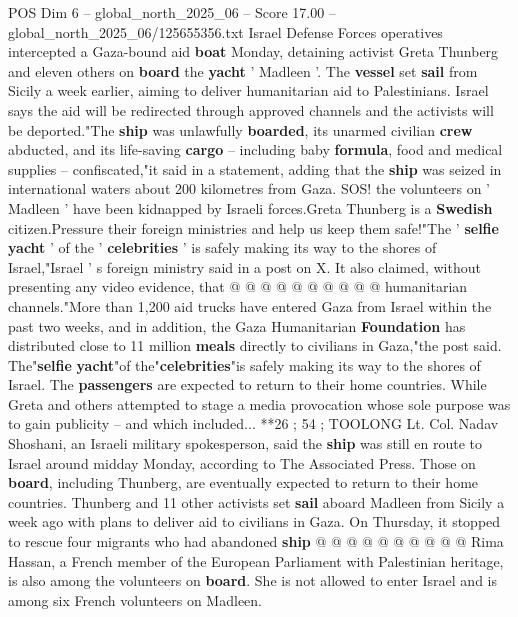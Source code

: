 \begin{textsample}{POS Dim 6 – global\_north\_2025\_06 – Score 17.00 – global\_north\_2025\_06/125655356.txt}  \label{ex:f6_pos_028}
Israel Defense Forces operatives intercepted a Gaza-bound aid \textbf{boat} Monday, detaining activist Greta Thunberg and eleven others on \textbf{board} the \textbf{yacht} ' Madleen '.
The \textbf{vessel} set \textbf{sail} from Sicily a week earlier, aiming to deliver humanitarian aid to Palestinians.
Israel says the aid will be redirected through approved channels and the activists will be deported."The \textbf{ship} was unlawfully \textbf{boarded}, its unarmed civilian \textbf{crew} abducted, and its life-saving \textbf{cargo} -- including baby \textbf{formula}, food and medical supplies -- confiscated,"it said in a statement, adding that the \textbf{ship} was seized in international waters about 200 kilometres from Gaza.
SOS! the volunteers on ' Madleen ' have been kidnapped by Israeli forces.Greta Thunberg is a \textbf{Swedish} citizen.Pressure their foreign ministries and help us keep them safe!"The ' \textbf{selfie} \textbf{yacht} ' of the ' \textbf{celebrities} ' is safely making its way to the shores of Israel,"Israel ' s foreign ministry said in a post on X.
It also claimed, without presenting any video evidence, that @ @ @ @ @ @ @ @ @ @ humanitarian channels."More than 1,200 aid trucks have entered Gaza from Israel within the past two weeks, and in addition, the Gaza Humanitarian \textbf{Foundation} has distributed close to 11 million \textbf{meals} directly to civilians in Gaza,"the post said.
The"\textbf{selfie} \textbf{yacht}"of the"\textbf{celebrities}"is safely making its way to the shores of Israel.
The \textbf{passengers} are expected to return to their home countries.
While Greta and others attempted to stage a media provocation whose sole purpose was to gain publicity -- and which included... **26 ; 54 ; TOOLONG Lt.
Col.
Nadav Shoshani, an Israeli military spokesperson, said the \textbf{ship} was still en route to Israel around midday Monday, according to The Associated Press.
Those on \textbf{board}, including Thunberg, are eventually expected to return to their home countries.
Thunberg and 11 other activists set \textbf{sail} aboard Madleen from Sicily a week ago with plans to deliver aid to civilians in Gaza.
On Thursday, it stopped to rescue four migrants who had abandoned \textbf{ship} @ @ @ @ @ @ @ @ @ @ Rima Hassan, a French member of the European Parliament with Palestinian heritage, is also among the volunteers on \textbf{board}.
She is not allowed to enter Israel and is among six French volunteers on Madleen.

\end{textsample}
